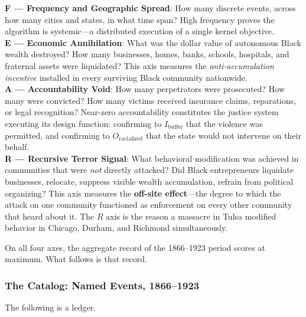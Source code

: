 \begin{tcolorbox}[
  colback=gray!5!white,
  colframe=gray!60!black,
  title={\textbf{F.E.A.R. Score: Axes of Systemic Terror}},
  fonttitle=\bfseries,
  breakable
]
\textbf{F --- Frequency and Geographic Spread}: How many discrete events, across how many cities and states, in what time span? High frequency proves the algorithm is systemic---a distributed execution of a single kernel objective.\\[4pt]
\textbf{E --- Economic Annihilation}: What was the dollar value of autonomous Black wealth destroyed? How many businesses, homes, banks, schools, hospitals, and fraternal assets were liquidated? This axis measures the \textit{anti-accumulation incentive} installed in every surviving Black community nationwide.\\[4pt]
\textbf{A --- Accountability Void}: How many perpetrators were prosecuted? How many were convicted? How many victims received insurance claims, reparations, or legal recognition? Near-zero accountability constitutes the justice system executing its design function: confirming to $I_{\text{buffer}}$ that the violence was permitted, and confirming to $O_{\text{racialized}}$ that the state would not intervene on their behalf.\\[4pt]
\textbf{R --- Recursive Terror Signal}: What behavioral modification was achieved in communities that were \textit{not} directly attacked? Did Black entrepreneurs liquidate businesses, relocate, suppress visible wealth accumulation, refrain from political organizing? This axis measures the \textbf{off-site effect}---the degree to which the attack on one community functioned as enforcement on every other community that heard about it. The $R$ axis is the reason a massacre in Tulsa modified behavior in Chicago, Durham, and Richmond simultaneously.
\end{tcolorbox}

On all four axes, the aggregate record of the 1866--1923 period scores at maximum. What follows is that record.

\subsubsection{The Catalog: Named Events, 1866--1923}

The following is a ledger.

